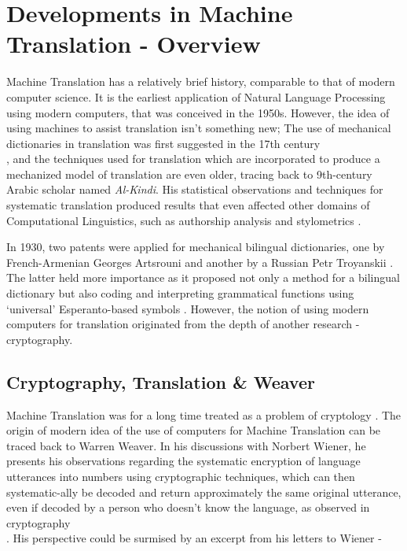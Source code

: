 \chapter{Developments in Machine Translation - Overview}

Machine Translation has a relatively brief history, comparable to that of modern computer science. It is the earliest application of Natural Language Processing using modern computers, that was conceived in the 1950s. However, the idea of using machines to assist translation isn't something new; The use of mechanical dictionaries in translation was first suggested in the 17th century\\ \cite{hutchins1992introduction}, and the techniques used for translation which are incorporated to produce a mechanized model of translation are even older, tracing back to 9th-century Arabic scholar named \textit{Al-Kindi}. His statistical observations and techniques for systematic translation produced results that even affected other domains of Computational Linguistics, such as authorship analysis and stylometrics \cite{dupont2018cryptological}.

In 1930, two patents were applied for mechanical bilingual dictionaries, one by French-Armenian Georges Artsrouni and another by a Russian Petr Troyanskii \cite{hutchins2001machine}. The latter held more importance as it proposed not only a method for a bilingual dictionary but also coding and interpreting grammatical functions using `universal' Esperanto-based symbols \cite{hutchins2005history}. However, the notion of using modern computers for translation originated from the depth of another research - cryptography. 

\section{Cryptography, Translation \& Weaver}

Machine Translation was for a long time treated as a problem of cryptology \cite{dupont2018cryptological}. The origin of modern idea of the use of computers for Machine Translation can be traced back to Warren Weaver. In his discussions with Norbert Wiener, he presents his observations regarding the systematic encryption of language utterances into numbers using cryptographic techniques, which can then systematic-ally be decoded and return approximately the same original utterance, even if decoded by a person who doesn't know the language, as observed in cryptography \\ \cite{locke1954mechanical}. His perspective could be surmised by an excerpt from his letters to Wiener -

